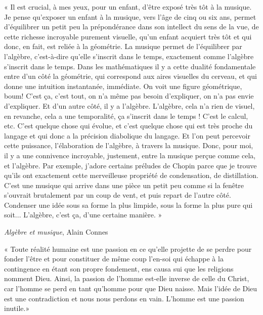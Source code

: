 \documentclass{article}
\begin{document}
\begin{center} « Il est crucial, à mes yeux, pour un enfant, d’être exposé très tôt à la musique. Je pense qu’exposer un enfant à la musique, vers l’âge de cinq ou six ans, permet d’équilibrer un petit peu la prépondérance dans son intellect du sens de la vue, de cette richesse incroyable purement visuelle, qu’un enfant acquiert très tôt et qui donc, en fait, est reliée à la géométrie. La musique permet de l’équilibrer par l’algèbre, c’est-à-dire qu’elle s’inscrit dans le temps, exactement comme l’algèbre s’inscrit dans le temps. Dans les mathématiques il y a cette dualité fondamentale entre d’un côté la géométrie, qui correspond aux aires visuelles du cerveau, et qui donne une intuition instantanée, immédiate. On voit une figure géométrique, boum! C’est ça, c’est tout, on n’a même pas besoin d’expliquer, on n’a pas envie d’expliquer. Et d’un autre côté, il y a l’algèbre. L’algèbre, cela n’a rien de visuel, en revanche, cela a une temporalité, ça s’inscrit dans le temps ! C’est le calcul, etc. C’est quelque chose qui évolue, et c’est quelque chose qui est très proche du langage et qui donc a la précision diabolique du langage. Et l’on peut percevoir cette puissance, l’élaboration de l’algèbre, à travers la musique. Donc, pour moi, il y a une connivence incroyable, justement, entre la musique perçue comme cela, et l’algèbre. Par exemple, j’adore certains préludes de Chopin parce que je trouve qu’ils ont exactement cette merveilleuse propriété de condensation, de distillation. C’est une musique qui arrive dans une pièce un petit peu comme si la fenêtre s’ouvrait brutalement par un coup de vent, et puis repart de l’autre côté. Condenser une idée sous sa forme la plus limpide, sous la forme la plus pure qui soit... L’algèbre, c’est ça, d’une certaine manière. » \end{center} 

\begin{flushright}\textit{Algèbre et musique}, Alain Connes\end{flushright}
\vspace{8pt}
\begin{center} « Toute réalité humaine est une passion en ce qu’elle projette de se perdre pour fonder l’être et pour constituer de même coup l’en-soi qui échappe à la contingence en étant son propre fondement, ens causa sui que les religions nomment Dieu. Ainsi, la passion de l’homme est-elle inverse de celle du Christ, car l’homme se perd en tant qu’homme pour que Dieu naisse. Mais l’idée de Dieu est une contradiction et nous nous perdons en vain. L’homme est une passion inutile.» \end{center} 
\end{document}
